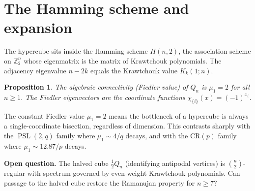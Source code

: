 \documentclass[11pt,a4paper]{article}
\theoremstyle{plain}
\newtheorem{proposition}[theorem]{Proposition}
\theoremstyle{definition}
\theoremstyle{remark}
\newcommand{\Z}{\mathbb{Z}}
\newcommand{\PSL}{\operatorname{PSL}}
\newcommand{\CR}{\mathrm{CR}}
\begin{document}
\section{The Hamming scheme and expansion}

The hypercube sits inside the Hamming scheme $H(n, 2)$, the association
scheme on $\Z_2^n$ whose eigenmatrix is the matrix of Krawtchouk polynomials.
The adjacency eigenvalue $n - 2k$ equals the Krawtchouk value $K_k(1; n)$.

\begin{tcolorbox}[colback=black!5, colframe=black!5,
  boxrule=0pt, sharp corners]
\begin{proposition}
The algebraic connectivity (Fiedler value) of $Q_n$ is $\mu_1 = 2$ for all
$n \ge 1$. The Fiedler eigenvectors are the coordinate functions
$\chi_{\{i\}}(x) = (-1)^{x_i}$.
\end{proposition}
\end{tcolorbox}

The constant Fiedler value $\mu_1 = 2$ means the bottleneck of a hypercube
is always a single-coordinate bisection, regardless of dimension.
This contrasts sharply with the $\PSL(2,q)$ family where $\mu_1 \sim 4/q$
decays, and with the $\CR(p)$ family where $\mu_1 \sim 12.87/p$ decays.

\begin{tcolorbox}[colback=blue!5, colframe=blue!5,
  boxrule=0pt, sharp corners]
\textbf{Open question.}
The halved cube $\frac{1}{2}Q_n$ (identifying antipodal vertices) is
$\binom{n}{2}$-regular with spectrum governed by even-weight Krawtchouk
polynomials. Can passage to the halved cube restore the Ramanujan property
for $n \ge 7$?
\end{tcolorbox}


%
%
\end{document}
